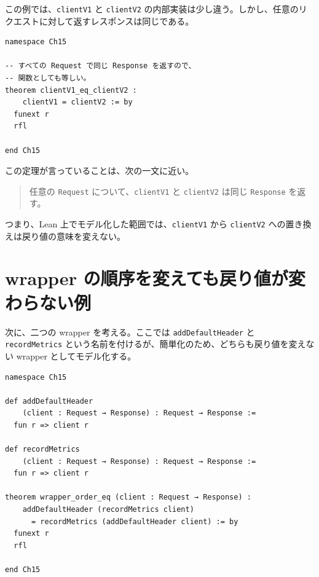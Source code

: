 この例では、\texttt{clientV1} と \texttt{clientV2} の内部実装は少し違う。しかし、任意のリクエストに対して返すレスポンスは同じである。

\begin{listing}[htbp]
\begin{verbatim}
namespace Ch15

-- すべての Request で同じ Response を返すので、
-- 関数としても等しい。
theorem clientV1_eq_clientV2 :
    clientV1 = clientV2 := by
  funext r
  rfl

end Ch15
\end{verbatim}
\caption{新旧 API client の振る舞い一致}
\label{lst:ch15-api-client-eq}
\end{listing}

この定理が言っていることは、次の一文に近い。

\begin{quote}
任意の \texttt{Request} について、\texttt{clientV1} と \texttt{clientV2} は同じ \texttt{Response} を返す。
\end{quote}

つまり、Lean 上でモデル化した範囲では、\texttt{clientV1} から \texttt{clientV2} への置き換えは戻り値の意味を変えない。


\section{wrapper の順序を変えても戻り値が変わらない例}

次に、二つの wrapper を考える。ここでは \texttt{addDefaultHeader} と \texttt{recordMetrics} という名前を付けるが、簡単化のため、どちらも戻り値を変えない wrapper としてモデル化する。

\begin{listing}[htbp]
\begin{verbatim}
namespace Ch15

def addDefaultHeader
    (client : Request → Response) : Request → Response :=
  fun r => client r

def recordMetrics
    (client : Request → Response) : Request → Response :=
  fun r => client r

theorem wrapper_order_eq (client : Request → Response) :
    addDefaultHeader (recordMetrics client)
      = recordMetrics (addDefaultHeader client) := by
  funext r
  rfl

end Ch15
\end{verbatim}
\caption{戻り値を変えない wrapper の順序交換}
\label{lst:ch15-wrapper-order}
\end{listing}

